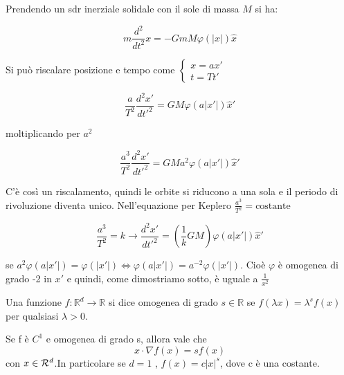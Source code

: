 \documentclass[Main.tex]{subfiles}
\begin{document}
\begin{dm}
	Prendendo un sdr inerziale solidale con il sole di massa $M$ si ha:

	\begin{equation}
		m \frac{d^2}{dt^2} x = -Gm M \varphi (|x|) \hat x
	\end{equation}

	Si può riscalare posizione e tempo come $ \begin{cases}
	 x=a x' \\
	 t= Tt'
	 \end{cases}$

	\begin{equation}
		\frac{a}{T^2} \frac{d^2x'}{dt'^2} = GM \varphi (a |x'|) \hat x'
	\end{equation}

	moltiplicando per $a^2$

	\begin{equation}
		\frac{a^3}{T^2} \frac{d^2x'}{dt'^2} = GM a^2 \varphi (a |x'|) \hat x'
	\end{equation}

	C'è così  un riscalamento, quindi le orbite si riducono a una sola e il periodo di rivoluzione diventa unico. Nell'equazione per Keplero $\frac{a^3}{T^2}=\text{costante}$

	\begin{equation}
		\frac{a^3}{T^2} = k \longrightarrow \frac{d^2x'}{dt'^2} = ( \frac{1}{k} GM) \varphi(a|x'|) \hat x'
	\end{equation}

	se $a^2 \varphi (a |x'|) = \varphi(|x'|) \Longleftrightarrow \varphi(a|x'|) = a^{-2} \varphi(|x'|)$. Cioè $\varphi$ è omogenea di grado -2 in $x'$ e quindi, come dimostriamo sotto, è uguale a $\frac{1}{x^2}$

\end{dm}



\begin{df}
	Una funzione $f : \mathbb{R}^d \rightarrow \mathbb{R}$ si dice omogenea di grado $s \in \mathbb{R}$ se $f(\lambda x) =
\lambda^s f(x)$ per qualsiasi $\lambda > 0$.
\end{df}

\begin{teo}
Se f è $C^1$ e omogenea di grado s, allora vale che
\begin{equation}
	x \cdot \nabla f(x) = s f(x)
\end{equation}
con $x \in \mathcal{R}^d$.In particolare se $d=1$ , $f(x) = c|x|^s$, dove c è una costante.
\end{teo}
\end{document}
